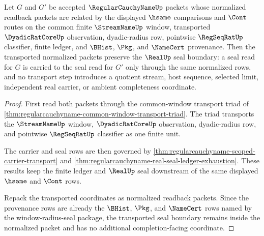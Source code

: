 \begin{theorem}
\label{thm:regularcauchyname-normalized-readback-seal-stability}
Let $G$ and $G'$ be accepted $\RegularCauchyNameUp$ packets whose normalized readback packets are related by the displayed $\hsame$ comparisons and $\Cont$ routes on the common finite $\StreamNameUp$ window, transported $\DyadicRatCoreUp$ observation, dyadic-radius row, pointwise $\RegSeqRatUp$ classifier, finite ledger, and $\BHist$, $\Pkg$, and $\NameCert$ provenance. Then the transported normalized packets preserve the $\RealUp$ seal boundary: a seal read for $G$ is carried to the seal read for $G'$ only through the same normalized rows, and no transport step introduces a quotient stream, host sequence, selected limit, independent real carrier, or ambient completeness coordinate.
\end{theorem}
\begin{proof}
First read both packets through the common-window transport triad of \autoref{thm:regularcauchyname-common-window-transport-triad}. The triad transports the $\StreamNameUp$ window, $\DyadicRatCoreUp$ observation, dyadic-radius row, and pointwise $\RegSeqRatUp$ classifier as one finite unit.

The carrier and seal rows are then governed by \autoref{thm:regularcauchyname-scoped-carrier-transport} and \autoref{thm:regularcauchyname-real-seal-ledger-exhaustion}. These results keep the finite ledger and $\RealUp$ seal downstream of the same displayed $\hsame$ and $\Cont$ rows.

Repack the transported coordinates as normalized readback packets. Since the provenance rows are already the $\BHist$, $\Pkg$, and $\NameCert$ rows named by the window-radius-seal package, the transported seal boundary remains inside the normalized packet and has no additional completion-facing coordinate.
\end{proof}

